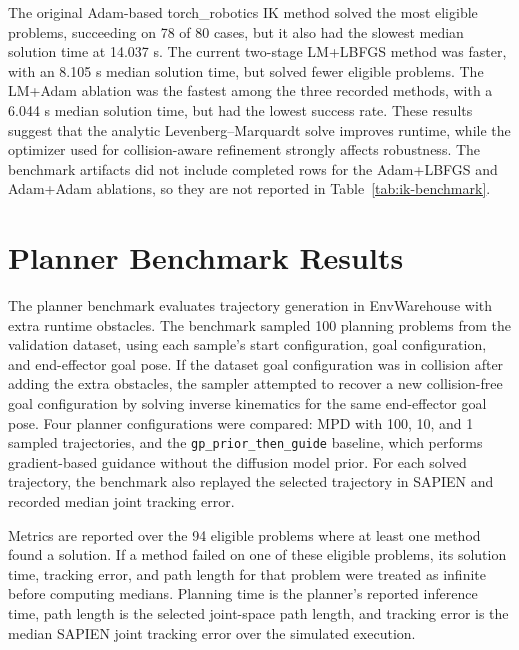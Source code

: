 \documentclass[11pt]{article}
\begin{document}
The original Adam-based torch\_robotics IK method solved the most eligible problems, succeeding on 78 of 80 cases, but it also had the slowest median solution time at 14.037 s. The current two-stage LM+LBFGS method was faster, with an 8.105 s median solution time, but solved fewer eligible problems. The LM+Adam ablation was the fastest among the three recorded methods, with a 6.044 s median solution time, but had the lowest success rate. These results suggest that the analytic Levenberg--Marquardt solve improves runtime, while the optimizer used for collision-aware refinement strongly affects robustness. The benchmark artifacts did not include completed rows for the Adam+LBFGS and Adam+Adam ablations, so they are not reported in Table~\ref{tab:ik-benchmark}.

\section{Planner Benchmark Results}

The planner benchmark evaluates trajectory generation in EnvWarehouse with extra runtime obstacles. The benchmark sampled 100 planning problems from the validation dataset, using each sample's start configuration, goal configuration, and end-effector goal pose. If the dataset goal configuration was in collision after adding the extra obstacles, the sampler attempted to recover a new collision-free goal configuration by solving inverse kinematics for the same end-effector goal pose. Four planner configurations were compared: MPD with 100, 10, and 1 sampled trajectories, and the \texttt{gp\_prior\_then\_guide} baseline, which performs gradient-based guidance without the diffusion model prior. For each solved trajectory, the benchmark also replayed the selected trajectory in SAPIEN and recorded median joint tracking error.

Metrics are reported over the 94 eligible problems where at least one method found a solution. If a method failed on one of these eligible problems, its solution time, tracking error, and path length for that problem were treated as infinite before computing medians. Planning time is the planner's reported inference time, path length is the selected joint-space path length, and tracking error is the median SAPIEN joint tracking error over the simulated execution.
\end{document}
